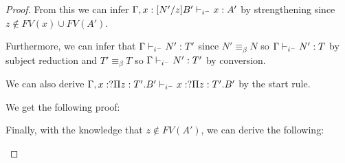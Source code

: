 \begin{proof}
From this we can infer $\Gamma, x : [N'/z]B' \judgeCI x : A'$
by strengthening since $z \notin FV(x)\cup FV(A')$.

Furthermore, we can infer that $\Gamma \judgeCI N' : T'$ since $N' \equiv_{\beta} N$ 
so $\Gamma \judgeCI N' : T$ by subject reduction and $T' \equiv_{\beta} T$ so $\Gamma \judgeCI N' : T'$
by conversion.

We can also derive $\Gamma, x : ?\Pi z : T' . B' \judgeCI x : ?\Pi z : T' . B'$ by the start rule. 

We get the following proof:

\begin{prooftree}
\end{prooftree}

Finally, with the knowledge that $z\notin FV(A')$, we can derive the following:

\begin{prooftree}
\end{prooftree}

\end{proof}
